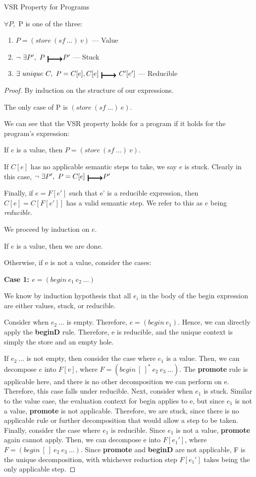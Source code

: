 \begin{lemma}\label{lem:vsr} VSR Property for Programs

$\forall P,$ P is one of the three:
\begin{enumerate}
    \item $P = (store\ (sf\ \dots)\ v)$ --- Value
    \item $\lnot\ \exists P',\ P\ \step P'$ --- Stuck
    \item $\exists\ unique\ C, \ P = C[e], C[e]\ \step\ C'[e']$ --- Reducible
\end{enumerate}
\end{lemma}
\begin{proof} By induction on the structure of our expressions.

The only case of P is $(store\ (sf\ \dots)\ e)$.

We can see that the VSR property holds for a program if it holds for the program's expression:

If $e$ is a value, then $P = (store\ (sf\ \dots)\ v)$.

If $C[e]$ has no applicable semantic steps to take, we say $e$ is stuck. Clearly in this case, $\lnot\ \exists P',\ P=C[e]\ \step P'$

Finally, if $e = F[e']$ such that e' is a reducible expression, then $C[e] = C[F[e']]$ has a valid semantic step. We refer to this as $e$ being \textit{reducible}.

We proceed by induction on $e$.

If $e$ is a value, then we are done.

Otherwise, if e is not a value, consider the cases:

\textbf{Case 1: $e = (begin\ e_1\ e_2\ \dots)$}

We know by induction hypothesis that all $e_i$ in the body of the begin expression are either values, stuck, or reducible.

Consider when $e_2\ \dots$ is empty. Therefore, $e = (begin\ e_1)$. Hence, we can directly apply the \textbf{beginD} rule. Therefore, e is reducible, and the unique context is simply the store and an empty hole.

If $e_2\ \dots$ is not empty, then consider the case where $e_1$ is a value. Then, we can decompose $e$ into $F[v]$, where $F = (begin\ [\ ]^{*}\ e_2\ e_3\ \dots)$. The \textbf{promote} rule is applicable here, and there is no other decomposition we can perform on e. Therefore, this case falls under reducible. Next, consider when $e_1$ is stuck. Similar to the value case, the evaluation context for begin applies to e, but since $e_1$ is not a value, \textbf{promote} is not applicable. Therefore, we are stuck, since there is no applicable rule or further decomposition that would allow a step to be taken. Finally, consider the case where $e_1$ is reducible. Since $e_1$ is not a value, \textbf{promote} again cannot apply.  Then, we can decompose e into $F[e_1']$, where $F = (begin\ [\ ]\ e_2\ e_3\ \dots)$. Since \textbf{promote} and \textbf{beginD} are not applicable, F is the unique decomposition, with whichever reduction step $F[e_1']$ takes being the only applicable step.


\end{proof}
